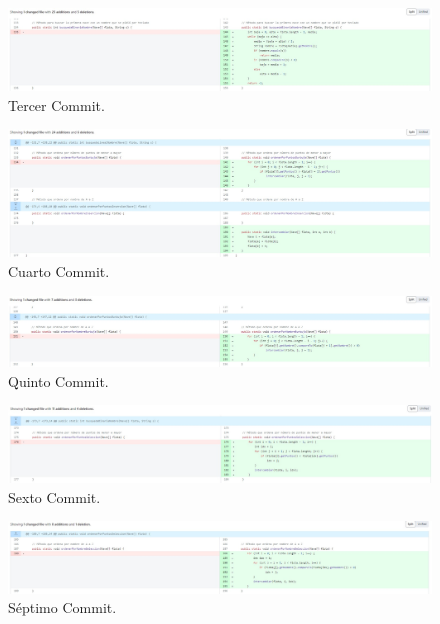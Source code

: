 \documentclass{article}
\begin{document}
\begin{figure}[H]
	\centering
	\includegraphics[width=1\textwidth,keepaspectratio]{img/commit03.jpg}
	\caption{Tercer Commit.}
\end{figure}
\begin{figure}[H]
	\centering
	\includegraphics[width=1\textwidth,keepaspectratio]{img/commit04.jpg}
	\caption{Cuarto Commit.}
\end{figure}
\begin{figure}[H]
	\centering
	\includegraphics[width=1\textwidth,keepaspectratio]{img/commit05.jpg}
	\caption{Quinto Commit.}
\end{figure}
\begin{figure}[H]
	\centering
	\includegraphics[width=1\textwidth,keepaspectratio]{img/commit06.jpg}
	\caption{Sexto Commit.}
\end{figure}
\begin{figure}[H]
	\centering
	\includegraphics[width=1\textwidth,keepaspectratio]{img/commit07.jpg}
	\caption{Séptimo Commit.}
\end{figure}
\end{document}
